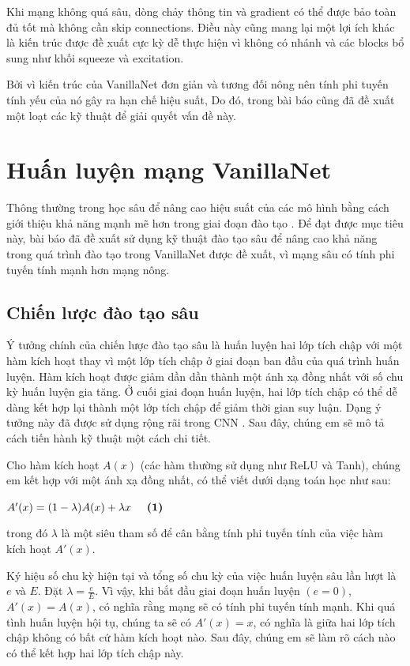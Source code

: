 \documentclass[a4paper,12pt]{article}
\begin{document}
Khi mạng không quá sâu, dòng chảy thông tin và gradient có thể được bảo toàn đủ tốt mà không cần skip connections. Điều này cũng mang lại một lợi ích khác là kiến trúc được đề xuất cực kỳ dễ thực hiện vì không có nhánh và các blocks bổ sung như khối squeeze và excitation. 

Bởi vì kiến trúc của VanillaNet đơn giản và tương đối nông nên tính phi tuyến tính yếu của nó gây ra hạn chế hiệu suất, Do đó, trong bài báo cũng đã đề xuất một loạt các kỹ thuật để giải quyết vấn đề này.

\section{Huấn luyện mạng VanillaNet}
Thông thường trong học sâu để nâng cao hiệu suất của các mô hình bằng cách giới thiệu khả năng mạnh mẽ hơn trong giai đoạn đào tạo \cite{chen2021universaladderneuralnetworks}. Để đạt được mục tiêu này, bài báo đã đề xuất sử dụng kỹ thuật đào tạo sâu để nâng cao khả năng trong quá trình đào tạo trong VanillaNet được đề xuất, vì mạng sâu có tính phi tuyến tính mạnh hơn mạng nông.
\subsection{Chiến lược đào tạo sâu}
Ý tưởng chính của chiến lược đào tạo sâu là huấn luyện hai lớp tích chập với một hàm kích hoạt thay vì một lớp tích chập ở giai đoạn ban đầu của quá trình huấn luyện. Hàm kích hoạt được giảm dần dần thành một ánh xạ đồng nhất với số chu kỳ huấn luyện gia tăng. Ở cuối giai đoạn huấn luyện, hai lớp tích chập có thể dễ dàng kết hợp lại thành một lớp tích chập để giảm thời gian suy luận. Dạng ý tưởng này đã được sử dụng rộng rãi trong CNN \cite{ding2021diversebranchblockbuilding, ding2021repvggmakingvggstyleconvnets, ding2022scalingkernels31x31revisiting, ding2019acnetstrengtheningkernelskeletons}. Sau đây, chúng em sẽ mô tả cách tiến hành kỹ thuật một cách chi tiết.

Cho hàm kích hoạt $A(x)$ (các hàm thường sử dụng như ReLU và Tanh), chúng em kết hợp với một ánh xạ đồng nhất, có thể viết dưới dạng toán học như sau:
\begin{center}
    $A'(x) = (1-\lambda)A(x) + \lambda x \hspace*{5mm} \textbf{(1)}$
\end{center}
trong đó $\lambda$ là một siêu tham số để cân bằng tính phi tuyến tính của việc hàm kích hoạt $A'(x)$. 

Ký hiệu số chu kỳ hiện tại và tổng số chu kỳ của việc huấn luyện sâu lần lượt là $e$ và $E$. Đặt $\lambda = \frac{e}{E}$. Vì vậy, khi bắt đầu giai đoạn huấn luyện $(e=0)$, $A'(x) = A(x)$, có nghĩa rằng mạng sẽ có tính phi tuyến tính mạnh. Khi quá tình huấn luyện hội tụ, chúng ta sẽ có $A'(x) = x$, có nghĩa là giữa hai lớp tích chập không có bất cứ hàm kích hoạt nào. Sau đây, chúng em sẽ làm rõ cách nào có thể kết hợp hai lớp tích chập này.
\end{document}
